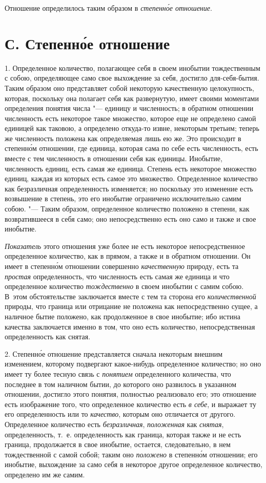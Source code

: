 Отношение определилось таким образом в {\em степенн\'{о}е отношение}.

\section[С. Степенн\'{о}е отношение]{С. Степенн\'{о}е отношение}
1. Определенное количество, полагающее себя в
своем инобытии тождественным с собою, определяющее само свое выхождение за
себя, достигло для-себя-бытия. Таким образом оно представляет собой
некоторую качественную целокупность, которая, поскольку она полагает себя
как развернутую, имеет своими моментами определения понятия числа "--- единицу
и численность; в обратном отношении численность есть некоторое такое
множество, которое еще не определено самой единицей как таковою, а
определено откуда-то извне, некоторым третьим; теперь же численность
положена как определяемая лишь ею же. Это происходит в степенн\'{о}м отношении,
где единица, которая сама по себе есть численность, есть вместе с тем
численность в отношении себя как единицы. Инобытие, численность единиц,
есть самая же единица. Степень есть некоторое множество единиц, каждая из
которых есть самое это множество. Определенное количество как безразличная
определенность изменяется; но поскольку это изменение есть возвышение в
степень, это его инобытие ограничено исключительно самим собою. "--- Таким
образом, определенное количество положено в степени, как возвратившееся в
себя само; оно непосредственно есть оно само и также и свое инобытие.

{\em Показатель} этого отношения уже более не есть
некоторое непосредственное определенное количество, как в прямом, а также и
в обратном отношении. Он имеет в степенн\'{о}м отношении совершенно
{\em качественную} природу, есть та
{\em простая} определенность, что численность есть
самая же единица и что определенное количество
{\em тождественно} в своем инобытии с самим собою.
В~этом обстоятельстве заключается вместе с тем та сторона его
{\em количественной} природы, что граница или отрицание
не положена как непосредственно сущее, а наличное бытие положено, как
продолженное в свое инобытие; ибо истина качества заключается именно в том,
что оно есть количество, непосредственная определенность как снятая.

2. Степенн\'{о}е отношение представляется сначала некоторым внешним изменением,
которому подвергают какое-нибудь определенное количество; но оно имеет ту
более тесную связь с {\em понятием} определенного
количества, что последнее в том наличном бытии, до которого оно развилось в
указанном отношении, достигло этого понятия, полностью реализовало его; это
отношение есть изображение того, что определенное количество есть
{\em в себе}, и выражает ту его определенность или то
{\em качество}, которым оно отличается от другого.
Определенное количество есть {\em безразличная},
{\em положенная} как {\em снятая},
определенность, т.~е. определенность как граница, которая также и не есть
граница, продолжается в свое инобытие, остается, следовательно, в нем
тождественной с самой собой; таким оно {\em положено} в
степенн\'{о}м отношении; его инобытие, выхождение за само себя в некоторое
другое определенное количество, определено им же самим.

